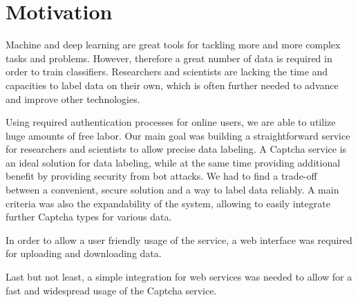 \section{Motivation}
\label{sec:motivation}

Machine and deep learning are great tools for tackling more and more complex tasks and problems. However, therefore a great number of data is required in order to train classifiers. Researchers and scientists are lacking the time and capacities to label data on their own, which is often further needed to advance and improve other technologies.

Using required authentication processes for online users, we are able to utilize huge amounts of free labor. Our main goal was building a straightforward service for researchers and scientists to allow precise data labeling. A Captcha service is an ideal solution for data labeling, while at the same time providing additional benefit by providing security from bot attacks.
We had to find a trade-off between a convenient, secure solution and a way to label data reliably.
A main criteria was also the expandability of the system, allowing to easily integrate further Captcha types for various data.

In order to allow a user friendly usage of the service, a web interface was required for uploading and downloading data.

Last but not least, a simple integration for web services was needed to allow for a fast and widespread usage of the Captcha service.

\clearpage
